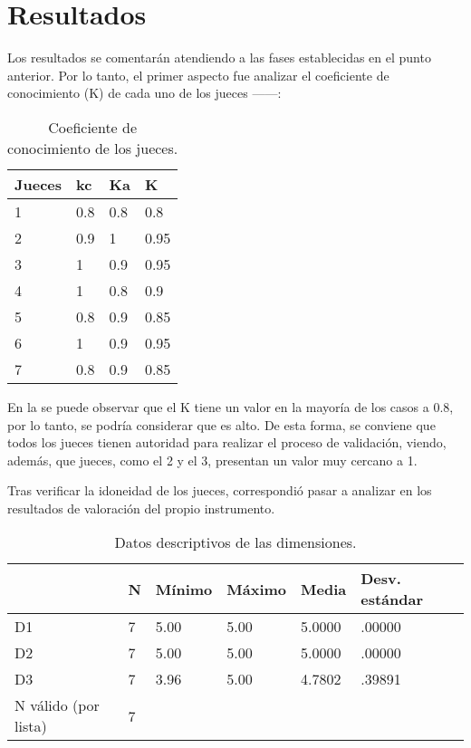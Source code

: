 \documentclass[spanish]{textolivre}
\begin{document}
\section{Resultados}\label{sec-conduta}
Los resultados se comentarán atendiendo a las fases establecidas en el punto anterior. Por lo tanto, el primer aspecto fue analizar el coeficiente de conocimiento (K) de cada uno de los jueces ——:

\begin{table}[htbp]
\centering
\begin{threeparttable}
\caption{Coeficiente de conocimiento de los jueces.}
\label{tbl5}
\centering
\begin{tabular}{llll}
\toprule
Jueces & kc & Ka & K \\ 
\midrule
1 & 0.8 & 0.8 & 0.8 \\
2 & 0.9 & 1 & 0.95 \\
3 & 1 & 0.9 & 0.95 \\
4 & 1 & 0.8 & 0.9 \\
5 & 0.8 & 0.9 & 0.85 \\
6 & 1 & 0.9 & 0.95 \\
7 & 0.8 & 0.9 & 0.85 \\
\bottomrule
\end{tabular}
\end{threeparttable}
\end{table}

En la  se puede observar que el K tiene un valor en la mayoría de los casos a 0.8, por lo tanto, se podría considerar que es alto. De esta forma, se conviene que todos los jueces tienen autoridad para realizar el proceso de validación, viendo, además, que  jueces, como el 2 y el 3, presentan un valor muy cercano a 1.

Tras verificar la idoneidad de los jueces, correspondió pasar a analizar en los resultados de valoración del propio instrumento.

\begin{table}[htbp]
\centering
\begin{threeparttable}
\caption{Datos descriptivos de las dimensiones.}
\label{tbl6}
\centering
\begin{tabular}{llllll}
\toprule
 & N & Mínimo & Máximo & Media & Desv. estándar \\ 
\midrule
D1 & 7 & 5.00 & 5.00 & 5.0000 & .00000 \\
D2 & 7 & 5.00 & 5.00 & 5.0000 & .00000 \\
D3 & 7 & 3.96 & 5.00 & 4.7802 & .39891 \\
N válido (por lista) & 7 & & & & \\
\bottomrule
\end{tabular}
\end{threeparttable}
\end{table}
\end{document}
